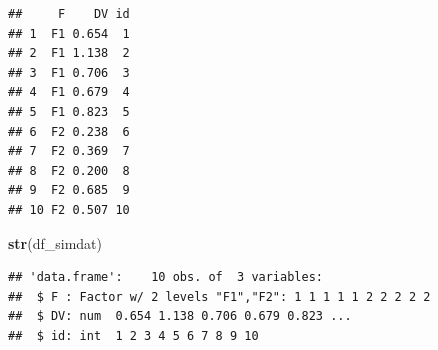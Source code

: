 \documentclass[12pt,]{krantz}
\newenvironment{Shaded}{\begin{snugshade}}{\end{snugshade}}
\newcommand{\CommentTok}[1]{\textcolor[rgb]{0.56,0.35,0.01}{\textit{#1}}}
\newcommand{\DataTypeTok}[1]{\textcolor[rgb]{0.13,0.29,0.53}{#1}}
\newcommand{\DecValTok}[1]{\textcolor[rgb]{0.00,0.00,0.81}{#1}}
\newcommand{\FloatTok}[1]{\textcolor[rgb]{0.00,0.00,0.81}{#1}}
\newcommand{\KeywordTok}[1]{\textcolor[rgb]{0.13,0.29,0.53}{\textbf{#1}}}
\newcommand{\NormalTok}[1]{#1}
\newcommand{\OperatorTok}[1]{\textcolor[rgb]{0.81,0.36,0.00}{\textbf{#1}}}
\newcommand{\OtherTok}[1]{\textcolor[rgb]{0.56,0.35,0.01}{#1}}
\newcommand{\StringTok}[1]{\textcolor[rgb]{0.31,0.60,0.02}{#1}}
\theoremstyle{definition}
\theoremstyle{definition}
\theoremstyle{definition}
\theoremstyle{remark}
\begin{document}
\begin{Shaded}
\end{Shaded}

\begin{verbatim}
##     F    DV id
## 1  F1 0.654  1
## 2  F1 1.138  2
## 3  F1 0.706  3
## 4  F1 0.679  4
## 5  F1 0.823  5
## 6  F2 0.238  6
## 7  F2 0.369  7
## 8  F2 0.200  8
## 9  F2 0.685  9
## 10 F2 0.507 10
\end{verbatim}

\begin{Shaded}
\begin{Highlighting}[]
\KeywordTok{str}\NormalTok{(df_simdat)}
\end{Highlighting}
\end{Shaded}

\begin{verbatim}
## 'data.frame':    10 obs. of  3 variables:
##  $ F : Factor w/ 2 levels "F1","F2": 1 1 1 1 1 2 2 2 2 2
##  $ DV: num  0.654 1.138 0.706 0.679 0.823 ...
##  $ id: int  1 2 3 4 5 6 7 8 9 10
\end{verbatim}

\begin{Shaded}
\end{Shaded}
\end{document}
